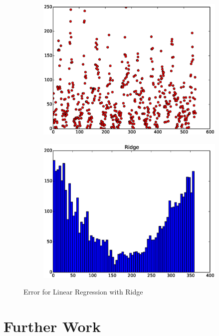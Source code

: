 \documentclass{article}
\begin{document}
\begin{figure}[H]
  \begin{subfigure}[!h]{0.5\textwidth}
    \centering
    \includegraphics[width=\textwidth]{./woodley/Ridge_heading_plot.eps}
  \end{subfigure}
  \begin{subfigure}[!h]{0.5\textwidth}
    \centering
    \includegraphics[width=\textwidth]{./woodley/Ridge_heading_bar.eps}
  \end{subfigure}
  \caption{Error for Linear Regression with Ridge}
\end{figure}

\section{Further Work}
\end{document}
